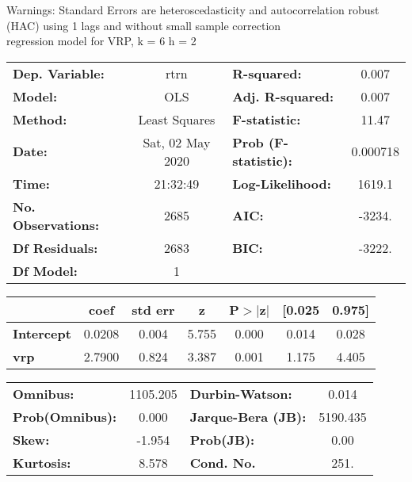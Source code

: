 Warnings: \newline
 [1] Standard Errors are heteroscedasticity and autocorrelation robust (HAC) using 1 lags and without small sample correction\\ 

regression model for VRP, k = 6 h = 2\begin{center}
\begin{tabular}{lclc}
\toprule
\textbf{Dep. Variable:}    &       rtrn       & \textbf{  R-squared:         } &     0.007   \\
\textbf{Model:}            &       OLS        & \textbf{  Adj. R-squared:    } &     0.007   \\
\textbf{Method:}           &  Least Squares   & \textbf{  F-statistic:       } &     11.47   \\
\textbf{Date:}             & Sat, 02 May 2020 & \textbf{  Prob (F-statistic):} &  0.000718   \\
\textbf{Time:}             &     21:32:49     & \textbf{  Log-Likelihood:    } &    1619.1   \\
\textbf{No. Observations:} &        2685      & \textbf{  AIC:               } &    -3234.   \\
\textbf{Df Residuals:}     &        2683      & \textbf{  BIC:               } &    -3222.   \\
\textbf{Df Model:}         &           1      & \textbf{                     } &             \\
\bottomrule
\end{tabular}
\begin{tabular}{lcccccc}
                   & \textbf{coef} & \textbf{std err} & \textbf{z} & \textbf{P$> |$z$|$} & \textbf{[0.025} & \textbf{0.975]}  \\
\midrule
\textbf{Intercept} &       0.0208  &        0.004     &     5.755  &         0.000        &        0.014    &        0.028     \\
\textbf{vrp}       &       2.7900  &        0.824     &     3.387  &         0.001        &        1.175    &        4.405     \\
\bottomrule
\end{tabular}
\begin{tabular}{lclc}
\textbf{Omnibus:}       & 1105.205 & \textbf{  Durbin-Watson:     } &    0.014  \\
\textbf{Prob(Omnibus):} &   0.000  & \textbf{  Jarque-Bera (JB):  } & 5190.435  \\
\textbf{Skew:}          &  -1.954  & \textbf{  Prob(JB):          } &     0.00  \\
\textbf{Kurtosis:}      &   8.578  & \textbf{  Cond. No.          } &     251.  \\
\bottomrule
\end{tabular}
\end{center}

